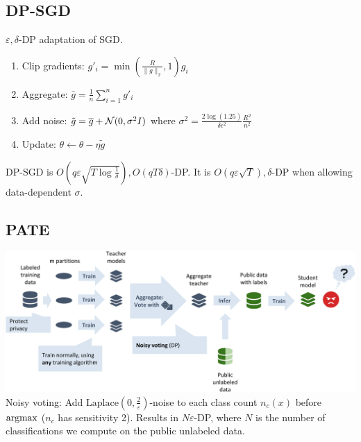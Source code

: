 \subsection*{DP-SGD}
$\varepsilon,\delta$-DP adaptation of SGD.
\begin{enumerate}
    \item Clip gradients: ${g}'_i=\min\left(\frac{R}{\|{g}\|_2},1\right){g_i}$
    \item Aggregate: $\bar{g}=\frac{1}{n}\sum_{i=1}^n {g}'_i$
    \item Add noise: $\tilde{g}=\overline{g}+\mathcal{N}(0,\sigma^2I)$ where $\sigma^2=\frac{2\log(1.25)}{\delta \epsilon^2}\frac{R^2}{n^2}$
    \item Update: $\theta\leftarrow \theta-\eta\tilde{g}$
\end{enumerate}
DP-SGD is $O\left(q\varepsilon\sqrt{T\log{\frac{1}{\delta}}}\right),O(qT\delta)$-DP. It is $O(q\varepsilon\sqrt{T}),\delta$-DP when allowing data-dependent $\sigma$.

\subsection*{PATE}
\includegraphics[width=\columnwidth]{img/pate.png}
Noisy voting: Add $\text{Laplace}(0,\frac{2}{\varepsilon})$-noise to each class count $n_c(x)$ before $\operatorname{\operatorname{argmax}}$ ($n_c$ has sensitivity 2). Results in $N\varepsilon$-DP, where $N$ is the number of classifications we compute on the public unlabeled data.
